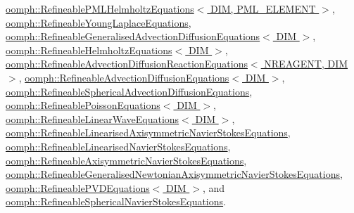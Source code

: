 \hyperlink{classoomph_1_1RefineablePMLHelmholtzEquations_ace2458391996badfd1c2ef8664a3bc27}{oomph\+::\+Refineable\+P\+M\+L\+Helmholtz\+Equations$<$ D\+I\+M, P\+M\+L\+\_\+\+E\+L\+E\+M\+E\+N\+T $>$}, \hyperlink{classoomph_1_1RefineableYoungLaplaceEquations_aef39cb1a9e6f4b117b840211fa8570cc}{oomph\+::\+Refineable\+Young\+Laplace\+Equations}, \hyperlink{classoomph_1_1RefineableGeneralisedAdvectionDiffusionEquations_acfd093a30da3a18eb1d86f24b48ab594}{oomph\+::\+Refineable\+Generalised\+Advection\+Diffusion\+Equations$<$ D\+I\+M $>$}, \hyperlink{classoomph_1_1RefineableHelmholtzEquations_a715bc9ef2960fd9246557e985c1eba7d}{oomph\+::\+Refineable\+Helmholtz\+Equations$<$ D\+I\+M $>$}, \hyperlink{classoomph_1_1RefineableAdvectionDiffusionReactionEquations_a3d19d1247a3ba838a67263b75d6341a0}{oomph\+::\+Refineable\+Advection\+Diffusion\+Reaction\+Equations$<$ N\+R\+E\+A\+G\+E\+N\+T, D\+I\+M $>$}, \hyperlink{classoomph_1_1RefineableAdvectionDiffusionEquations_a19d216ae9ab2602a9da97babe7b66c21}{oomph\+::\+Refineable\+Advection\+Diffusion\+Equations$<$ D\+I\+M $>$}, \hyperlink{classoomph_1_1RefineableSphericalAdvectionDiffusionEquations_ab9d53dc4a0842309fbb0a04c53f9575c}{oomph\+::\+Refineable\+Spherical\+Advection\+Diffusion\+Equations}, \hyperlink{classoomph_1_1RefineablePoissonEquations_ab778ee621a1e0fc89f10533134a6f825}{oomph\+::\+Refineable\+Poisson\+Equations$<$ D\+I\+M $>$}, \hyperlink{classoomph_1_1RefineableLinearWaveEquations_a83b2ad0eb1bbcfe802b48d433d104f3d}{oomph\+::\+Refineable\+Linear\+Wave\+Equations$<$ D\+I\+M $>$}, \hyperlink{classoomph_1_1RefineableLinearisedAxisymmetricNavierStokesEquations_a417329381693b43b4f29db62275e7d08}{oomph\+::\+Refineable\+Linearised\+Axisymmetric\+Navier\+Stokes\+Equations}, \hyperlink{classoomph_1_1RefineableLinearisedNavierStokesEquations_a54024569bb3ee36f0679c8bbfa2673a6}{oomph\+::\+Refineable\+Linearised\+Navier\+Stokes\+Equations}, \hyperlink{classoomph_1_1RefineableAxisymmetricNavierStokesEquations_a685e10bb8a044e2fd274401a7e70dc33}{oomph\+::\+Refineable\+Axisymmetric\+Navier\+Stokes\+Equations}, \hyperlink{classoomph_1_1RefineableGeneralisedNewtonianAxisymmetricNavierStokesEquations_aa0085413944f5d84578ae28f57d7f4fc}{oomph\+::\+Refineable\+Generalised\+Newtonian\+Axisymmetric\+Navier\+Stokes\+Equations}, \hyperlink{classoomph_1_1RefineablePVDEquations_a1c3251344b800eff097da2ce76a127fc}{oomph\+::\+Refineable\+P\+V\+D\+Equations$<$ D\+I\+M $>$}, and \hyperlink{classoomph_1_1RefineableSphericalNavierStokesEquations_a5b669a851b9bc3dee0c8e483ce771be6}{oomph\+::\+Refineable\+Spherical\+Navier\+Stokes\+Equations}.



